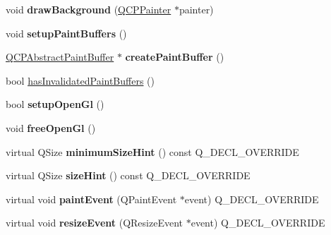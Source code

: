 \begin{DoxyCompactItemize}
\item 
void {\bfseries draw\+Background} (\hyperlink{class_q_c_p_painter}{Q\+C\+P\+Painter} $\ast$painter)\hypertarget{class_q_custom_plot_a05dd52438cee4353b18c1e53a439008d}{}\label{class_q_custom_plot_a05dd52438cee4353b18c1e53a439008d}

\item 
void {\bfseries setup\+Paint\+Buffers} ()\hypertarget{class_q_custom_plot_a2685341f7242c3882f4cc5e379308d71}{}\label{class_q_custom_plot_a2685341f7242c3882f4cc5e379308d71}

\item 
\hyperlink{class_q_c_p_abstract_paint_buffer}{Q\+C\+P\+Abstract\+Paint\+Buffer} $\ast$ {\bfseries create\+Paint\+Buffer} ()\hypertarget{class_q_custom_plot_a943b57596a1adf7f0e75c3b50e407ae6}{}\label{class_q_custom_plot_a943b57596a1adf7f0e75c3b50e407ae6}

\item 
bool \hyperlink{class_q_custom_plot_ad452b582348c8e99462d83fe1cd0279b}{has\+Invalidated\+Paint\+Buffers} ()
\item 
bool {\bfseries setup\+Open\+Gl} ()\hypertarget{class_q_custom_plot_a8954c4667c51070ff4e9b02d858fd190}{}\label{class_q_custom_plot_a8954c4667c51070ff4e9b02d858fd190}

\item 
void {\bfseries free\+Open\+Gl} ()\hypertarget{class_q_custom_plot_aaa3073362074581a7b5905726b4a0067}{}\label{class_q_custom_plot_aaa3073362074581a7b5905726b4a0067}

\item 
virtual Q\+Size {\bfseries minimum\+Size\+Hint} () const Q\+\_\+\+D\+E\+C\+L\+\_\+\+O\+V\+E\+R\+R\+I\+DE\hypertarget{class_q_custom_plot_a4be5390c093302178f9d1481cb5fe7a1}{}\label{class_q_custom_plot_a4be5390c093302178f9d1481cb5fe7a1}

\item 
virtual Q\+Size {\bfseries size\+Hint} () const Q\+\_\+\+D\+E\+C\+L\+\_\+\+O\+V\+E\+R\+R\+I\+DE\hypertarget{class_q_custom_plot_a54364e3e6c4022d92e4ea23bd0843cc6}{}\label{class_q_custom_plot_a54364e3e6c4022d92e4ea23bd0843cc6}

\item 
virtual void {\bfseries paint\+Event} (Q\+Paint\+Event $\ast$event) Q\+\_\+\+D\+E\+C\+L\+\_\+\+O\+V\+E\+R\+R\+I\+DE\hypertarget{class_q_custom_plot_acc43b1883cac1bdcd49e589991af4ccb}{}\label{class_q_custom_plot_acc43b1883cac1bdcd49e589991af4ccb}

\item 
virtual void {\bfseries resize\+Event} (Q\+Resize\+Event $\ast$event) Q\+\_\+\+D\+E\+C\+L\+\_\+\+O\+V\+E\+R\+R\+I\+DE\hypertarget{class_q_custom_plot_a0b69658ba8042a7e68238604c056d695}{}\label{class_q_custom_plot_a0b69658ba8042a7e68238604c056d695}


\end{DoxyCompactItemize}
